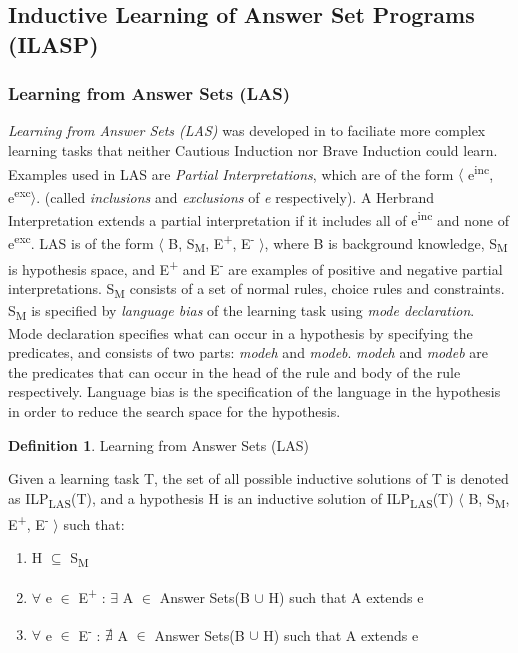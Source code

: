 \documentclass[12pt,twoside]{report}
\theoremstyle{plain}
\theoremstyle{definition}
\newtheorem{defn}[thm]{Definition} %
\begin{document}
\subsection{Inductive Learning of Answer Set Programs (ILASP)}
\label{section_lasp}

\subsubsection{Learning from Answer Sets (LAS)}
\textit{Learning from Answer Sets (LAS)} was developed in \cite{Law2014} to faciliate more complex learning tasks that neither Cautious Induction nor Brave Induction could learn.
Examples used in LAS are \textit{Partial Interpretations}, which are of the form $\langle$ e\textsuperscript{inc}, e\textsuperscript{exc}$\rangle$. (called \textit{inclusions} and \textit{exclusions} of \textit{e} respectively).  A Herbrand Interpretation extends a partial interpretation if it includes all of e\textsuperscript{inc} and none of e\textsuperscript{exc}.
LAS is of the form $\langle$ B, S\textsubscript{M}, E\textsuperscript{+}, E\textsuperscript{-} $\rangle$, where B is background knowledge, S\textsubscript{M} is hypothesis space, and E\textsuperscript{+} and E\textsuperscript{-} are examples of positive and negative partial interpretations. S\textsubscript{M} consists of a set of normal rules, choice rules and constraints. S\textsubscript{M} is specified by \textit{language bias} of the learning task using \textit{mode declaration}. Mode declaration specifies what can occur in a hypothesis by specifying the predicates, and consists of two parts: \textit{modeh} and \textit{modeb}.  \textit{modeh} and \textit{modeb} are the predicates that can occur in the head of the rule and body of the rule respectively. Language bias is the specification of the language in the hypothesis in order to reduce the search space for the hypothesis.

\begin{defn}{Learning from Answer Sets (LAS)}

Given a learning task T, the set of all possible inductive solutions of T is denoted as ILP\textsubscript{LAS}(T), and a hypothesis H is an inductive solution of ILP\textsubscript{LAS}(T) $\langle$ B, S\textsubscript{M}, E\textsuperscript{+}, E\textsuperscript{-} $\rangle$ such that:
\begin{enumerate}
\item H $\subseteq$ S\textsubscript{M}
\item $\forall$ e $\in$ E\textsuperscript{+} : $\exists$ A $\in$ Answer Sets(B $\cup$ H) such that A extends e
\item $\forall$ e $\in$ E\textsuperscript{-} : $\nexists$ A $\in$ Answer Sets(B $\cup$ H) such that A extends e
\end{enumerate}

\end{defn}
\end{document}
